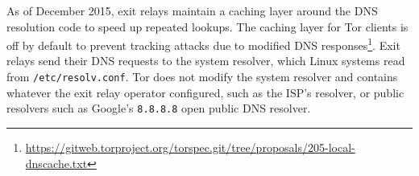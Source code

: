 As of December 2015, exit relays maintain a caching layer
around the DNS resolution code to speed up repeated lookups.
The caching layer for Tor clients is off by default to prevent tracking attacks
due to modified DNS
responses\footnote{\url{https://gitweb.torproject.org/torspec.git/tree/proposals/205-local-dnscache.txt}}. 
Exit relays send
their DNS requests to the system resolver, which Linux systems read from
\texttt{/etc/resolv.conf}.  Tor does not modify the system resolver and
contains whatever the exit relay operator configured, such as the ISP's resolver,
or public resolvers such as Google's {\tt 8.8.8.8} open public DNS resolver.
